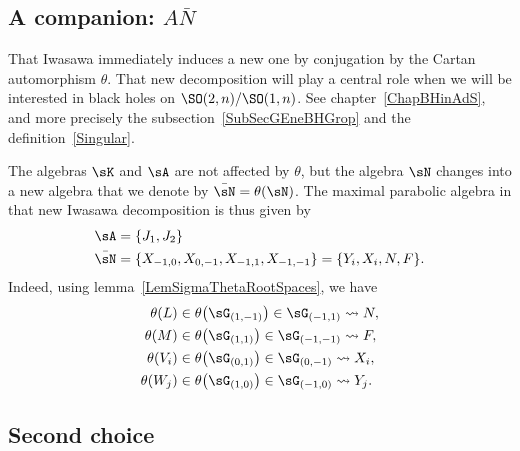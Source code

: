 \subsection{A companion: \texorpdfstring{$A\bar N$}{AN}}

That Iwasawa immediately induces a new one by conjugation by the Cartan automorphism $\theta$. That new decomposition will play a central role when we will be interested in black holes on $\SO(2,n)/\SO(1,n)$. See chapter~\ref{ChapBHinAdS}, and more precisely the subsection~\ref{SubSecGEneBHGrop} and the definition~\ref{Singular}.

The algebras $\sK$ and $\sA$ are not affected by $\theta$, but the algebra $\sN$ changes into a new algebra that we denote by $\bar\sN=\theta(\sN)$. The maximal parabolic algebra in that new Iwasawa decomposition is thus given by
\begin{equation}
	\begin{aligned}[]
		\sA     & =\{ J_1,J_2 \}                                                 \\
		\bar\sN & =\{ X_{-1,0},X_{0,-1},X_{-1,1},X_{-1,-1} \}=\{ Y_i,X_i,N,F \}.
	\end{aligned}
\end{equation}
Indeed, using lemma~\ref{LemSigmaThetaRootSpaces}, we have
\begin{equation}
	\begin{aligned}[]
		\theta(L)   & \in\theta\big( \sG_{(1,-1)} \big)\in\sG_{(-1,1)}\leadsto N,  \\
		\theta(M)   & \in\theta\big( \sG_{(1,1)} \big)\in\sG_{(-1,-1)}\leadsto F,  \\
		\theta(V_i) & \in\theta\big( \sG_{(0,1)} \big)\in\sG_{(0,-1)}\leadsto X_i, \\
		\theta(W_j) & \in\theta\big( \sG_{(1,0)} \big)\in\sG_{(-1,0)}\leadsto Y_j.
	\end{aligned}
\end{equation}

\subsection{Second choice}
\label{SubSecANbarIwa}

